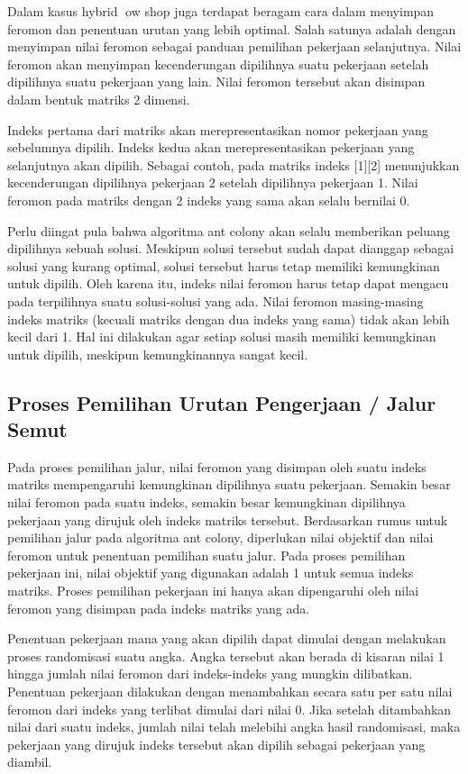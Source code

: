 Dalam kasus hybrid ow shop juga terdapat beragam cara dalam menyimpan feromon dan
penentuan urutan yang lebih optimal. Salah satunya adalah dengan menyimpan nilai feromon
sebagai panduan pemilihan pekerjaan selanjutnya. Nilai feromon akan menyimpan kecenderungan
dipilihnya suatu pekerjaan setelah dipilihnya suatu pekerjaan yang lain. Nilai feromon tersebut
akan disimpan dalam bentuk matriks 2 dimensi.

Indeks pertama dari matriks akan merepresentasikan nomor pekerjaan yang sebelumnya dipilih.
Indeks kedua akan merepresentasikan pekerjaan yang selanjutnya akan dipilih. Sebagai contoh,
pada matriks indeks [1][2] menunjukkan kecenderungan dipilihnya pekerjaan 2 setelah dipilihnya
pekerjaan 1. Nilai feromon pada matriks dengan 2 indeks yang sama akan selalu bernilai 0.

Perlu diingat pula bahwa algoritma ant colony akan selalu memberikan peluang dipilihnya sebuah
solusi. Meskipun solusi tersebut sudah dapat dianggap sebagai solusi yang kurang optimal,
solusi tersebut harus tetap memiliki kemungkinan untuk dipilih. Oleh karena itu, indeks nilai feromon
harus tetap dapat mengacu pada terpilihnya suatu solusi-solusi yang ada. Nilai feromon
masing-masing indeks matriks (kecuali matriks dengan dua indeks yang sama) tidak akan lebih kecil
dari 1. Hal ini dilakukan agar setiap solusi masih memiliki kemungkinan untuk dipilih, meskipun
kemungkinannya sangat kecil.

\subsection{Proses Pemilihan Urutan Pengerjaan / Jalur Semut}
Pada proses pemilihan jalur, nilai feromon yang disimpan oleh suatu indeks matriks mempengaruhi
kemungkinan dipilihnya suatu pekerjaan. Semakin besar nilai feromon pada suatu indeks, semakin
besar kemungkinan dipilihnya pekerjaan yang dirujuk oleh indeks matriks tersebut. Berdasarkan
rumus untuk pemilihan jalur pada algoritma ant colony, diperlukan nilai objektif dan nilai feromon
untuk penentuan pemilihan suatu jalur. Pada proses pemilihan pekerjaan ini, nilai objektif
yang digunakan adalah 1 untuk semua indeks matriks. Proses pemilihan pekerjaan ini hanya akan
dipengaruhi oleh nilai feromon yang disimpan pada indeks matriks yang ada.

Penentuan pekerjaan mana yang akan dipilih dapat dimulai dengan melakukan proses randomisasi
suatu angka. Angka tersebut akan berada di kisaran nilai 1 hingga jumlah nilai feromon
dari indeks-indeks yang mungkin dilibatkan. Penentuan pekerjaan dilakukan dengan menambahkan
secara satu per satu nilai feromon dari indeks yang terlibat dimulai dari nilai 0. Jika setelah
ditambahkan nilai dari suatu indeks, jumlah nilai telah melebihi angka hasil randomisasi, maka
pekerjaan yang dirujuk indeks tersebut akan dipilih sebagai pekerjaan yang diambil.

